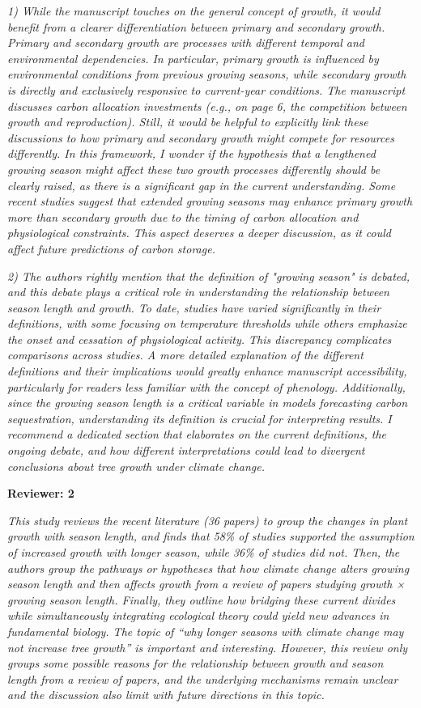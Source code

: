\documentclass[11pt]{article}
\begin{document}
\emph{1) While the manuscript touches on the general concept of growth, it would benefit from a clearer differentiation between primary and secondary growth. Primary and secondary growth are processes with different temporal and environmental dependencies. In particular, primary growth is influenced by environmental conditions from previous growing seasons, while secondary growth is directly and exclusively responsive to current-year conditions. The manuscript discusses carbon allocation investments (e.g., on page 6, the competition between growth and reproduction). Still, it would be helpful to explicitly link these discussions to how primary and secondary growth might compete for resources differently. In this framework, I wonder if the hypothesis that a lengthened growing season might affect these two growth processes differently should be clearly raised, as there is a significant gap in the current understanding. Some recent studies suggest that extended growing seasons may enhance primary growth more than secondary growth due to the timing of carbon allocation and physiological constraints. This aspect deserves a deeper discussion, as it could affect future predictions of carbon storage.}


\emph{2) The authors rightly mention that the definition of "growing season" is debated, and this debate plays a critical role in understanding the relationship between season length and growth. To date, studies have varied significantly in their definitions, with some focusing on temperature thresholds while others emphasize the onset and cessation of physiological activity. This discrepancy complicates comparisons across studies. A more detailed explanation of the different definitions and their implications would greatly enhance manuscript accessibility, particularly for readers less familiar with the concept of phenology. Additionally, since the growing season length is a critical variable in models forecasting carbon sequestration, understanding its definition is crucial for interpreting results. I recommend a dedicated section that elaborates on the current definitions, the ongoing debate, and how different interpretations could lead to divergent conclusions about tree growth under climate change.}

{\bf Reviewer: 2}


\emph{This study reviews the recent literature (36 papers) to group the changes in plant growth with season length, and finds that 58\% of studies supported the assumption of increased growth with longer season, while 36\% of studies did not. Then, the authors group the pathways or hypotheses that how climate change alters growing season length and then affects growth from a review of papers studying growth × growing season length. Finally, they outline how bridging these current divides while simultaneously integrating ecological theory could yield new advances in fundamental biology. The topic of “why longer seasons with climate change may not increase tree growth” is important and interesting. However, this review only groups some possible reasons for the relationship between growth and season length from a review of papers, and the underlying mechanisms remain unclear and the discussion also limit with future directions in this topic.}
\end{document}
